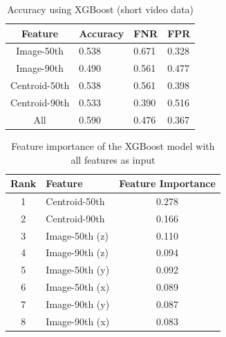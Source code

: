 \begin{table}[!b]
  \centering
	\caption{Accuracy using XGBoost (short video data)}
		\begin{tabular}{clll} \hline
			Feature       & Accuracy & FNR   & FPR    \\ \hline \hline
			Image-50th    & 0.538    & 0.671 & 0.328  \\
			Image-90th    & 0.490    & 0.561 & 0.477  \\
			Centroid-50th & 0.538    & 0.561 & 0.398  \\
			Centroid-90th & 0.533    & 0.390 & 0.516  \\
			All           & 0.590    & 0.476 & 0.367  \\ \hline
		\end{tabular}
	\label{result_xg_train}
\end{table}

\begin{table}[!b]
	\centering
	\caption{Feature importance of the XGBoost model with all features as input}
	\begin{tabular}{clc}
		\hline
		Rank & Feature        & Feature Importance \\ \hline \hline
		1    & Centroid-50th  & 0.278              \\
		2    & Centroid-90th  & 0.166              \\
		3    & Image-50th (z) & 0.110              \\
		4    & Image-90th (z) & 0.094              \\
		5    & Image-50th (y) & 0.092              \\
		6    & Image-50th (x) & 0.089              \\
		7    & Image-90th (y) & 0.087              \\
		8    & Image-90th (x) & 0.083              \\ \hline
	\end{tabular}
	\label{feature_importance_xg}
\end{table}